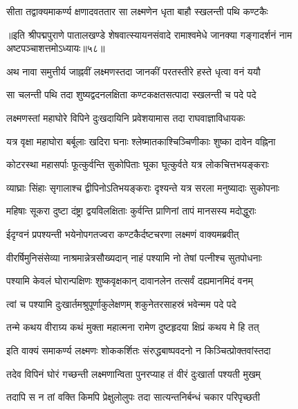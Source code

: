 \twolineshloka
{सीता तद्वाक्यमाकर्ण्य क्षणादवततार सा}
{लक्ष्मणेन धृता बाहौ स्खलन्ती पथि कण्टकैः}%

{॥इति श्रीपद्मपुराणे पातालखण्डे शेषवात्स्यायनसंवादे रामाश्वमेधे जानक्या गङ्गादर्शनं नाम अष्टपञ्चाशत्तमोऽध्यायः॥५८॥}

\resetShloka


\twolineshloka
{अथ नावा समुत्तीर्य जाह्नवीं लक्ष्मणस्तदा}
{जानकीं परतस्तीरे हस्ते धृत्वा वनं ययौ}%

\twolineshloka
{सा चलन्ती पथि तदा शुष्यद्वदनलक्षिता}
{कण्टकक्षतसत्पादा स्खलन्ती च पदे पदे}%

\twolineshloka
{लक्ष्मणस्तां महाघोरे विपिने दुःखदायिनि}
{प्रवेशयामास तदा राघवाज्ञाविधायकः}%

\twolineshloka
{यत्र वृक्षा महाघोरा बर्बूलाः खदिरा घनाः}
{श्लेष्मातकाश्चिञ्चिणीकाः शुष्का दावेन वह्निना}%

\twolineshloka
{कोटरस्था महासर्पाः फूत्कुर्वन्ति सुकोपिताः}
{घूका घूत्कुर्वते यत्र लोकचित्तभयङ्कराः}%

\twolineshloka
{व्याघ्राः सिंहाः सृगालाश्च द्वीपिनोऽतिभयङ्कराः}
{दृश्यन्ते यत्र सरला मनुष्यादाः सुकोपनाः}%

\twolineshloka
{महिषाः सूकरा दुष्टा दंष्ट्रा द्वयविलक्षिताः}
{कुर्वन्ति प्राणिनां तापं मानसस्य मदोद्धुराः}%

\twolineshloka
{ईदृग्वनं प्रपश्यन्ती भयेनोपगतज्वरा}
{कण्टकैर्दष्टचरणा लक्ष्मणं वाक्यमब्रवीत्}%


\twolineshloka
{वीरर्षिमुनिसंसेव्या नाश्रमान्नेत्रसौख्यदान्}
{नाहं पश्यामि नो तेषां पत्नीश्च सुतपोधनाः}%

\twolineshloka
{पश्यामि केवलं घोरान्पक्षिणः शुष्कवृक्षकान्}
{दावानलेन तत्सर्वं दह्यमानमिदं वनम्}%

\twolineshloka
{त्वां च पश्यामि दुःखार्तमश्रुपूर्णाकुलेक्षणम्}
{शकुनेतरसाहस्रं भवेन्मम पदे पदे}%

\twolineshloka
{तन्मे कथय वीराग्र्य कथं मुक्ता महात्मना}
{रामेण दुष्टहृदया क्षिप्रं कथय मे हि तत्}%

\twolineshloka
{इति वाक्यं समाकर्ण्य लक्ष्मणः शोककर्शितः}
{संरुद्धबाष्पवदनो न किञ्चित्प्रोक्तवांस्तदा}%

\twolineshloka
{तदेव विपिनं घोरं गच्छन्ती लक्ष्मणान्विता}
{पुनरप्याह तं वीरं दुःखार्ता पश्यती मुखम्}%

\twolineshloka
{तदापि स न तां वक्ति किमपि प्रेक्षुलोलुपः}
{तदा सात्यन्तनिर्बन्धं चकार परिपृच्छती}%

